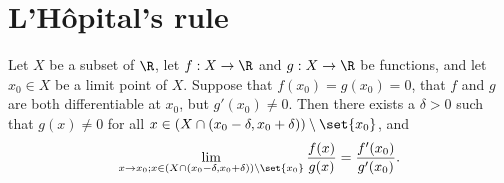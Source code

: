 \section{L'Hôpital's rule}\label{i:sec:10.5}

\begin{prop}\label{i:10.5.1}
  Let \(X\) be a subset of \(\R\), let \(f : X \to \R\) and \(g : X \to \R\) be functions, and let \(x_0 \in X\) be a limit point of \(X\).
  Suppose that \(f(x_0) = g(x_0) = 0\), that \(f\) and \(g\) are both differentiable at \(x_0\), but \(g'(x_0) \neq 0\).
  Then there exists a \(\delta > 0\) such that \(g(x) \neq 0\) for all \(x \in (X \cap (x_0 - \delta, x_0 + \delta)) \setminus \set{x_0}\), and
  \[
    \lim_{x \to x_0 ; x \in (X \cap (x_0 - \delta, x_0 + \delta)) \setminus \set{x_0}} \dfrac{f(x)}{g(x)} = \dfrac{f'(x_0)}{g'(x_0)}.
  \]
\end{prop}

